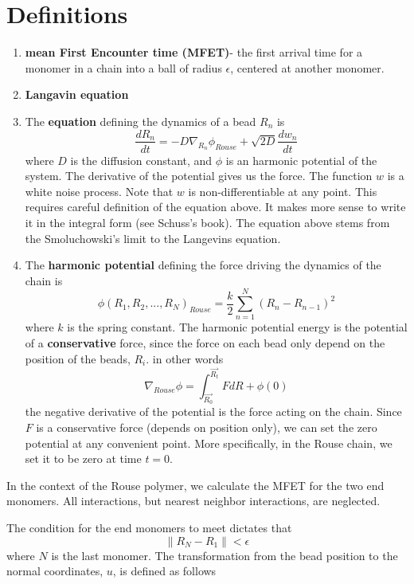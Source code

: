 \documentclass[12pt]{report}
\begin{document}
\section{Definitions}
\begin{enumerate}
\item \textbf{mean First Encounter time (MFET)}- the first arrival time for a monomer in a chain into a ball of radius $\epsilon$, centered at another monomer. 
\item \textbf{Langavin equation}
\item The \textbf{equation} defining the dynamics of a bead $R_n$ is 
\begin{equation*}
\frac{dR_n}{dt}=-D\nabla_{R_n}\phi_{Rouse} +\sqrt{2D}\frac{dw_n}{dt}
\end{equation*}
where $D$ is the diffusion constant, and $\phi$ is an harmonic potential of the system. The derivative of the potential gives us the force. The function $w$ is a white noise process. Note that $w$ is non-differentiable at any point. This requires careful definition of the equation above. It makes more sense to write it in the integral form (see Schuss's book). The equation above stems from the Smoluchowski's limit to the Langevins equation.

\item The \textbf{harmonic potential} defining the force driving the dynamics of the chain is 
\begin{equation*}
\phi(R_1,R_2,...,R_N)_{Rouse} = \frac{k}{2}\sum_{n=1}^{N}(R_n-R_{n-1})^2
\end{equation*}
where $k$ is the spring constant. The harmonic potential energy is the potential of a \textbf{conservative} force, since the force on each bead only depend on the position of the beads, $R_i$.
in other words 
\begin{equation}
\nabla_{Rouse}\phi = \int_{\vec{R_0}}^{\vec{R_t}}FdR +\phi(0)
\end{equation}  
the negative derivative of the potential is the force acting on the chain. Since $F$ is a conservative force (depends on position only), we can set the zero potential at any convenient point. More specifically, in the Rouse chain, we set it to be zero at time $t=0$.
\end{enumerate}

In the context of the Rouse polymer, we calculate the MFET for the two end monomers. All interactions, but nearest neighbor interactions, are neglected. 

The condition for the end monomers to meet dictates that 
\begin{equation*}
\|R_N-R_1\|<\epsilon
\end{equation*}
where $N$ is the last monomer. The transformation from the bead position to the normal coordinates, $u$, is defined as follows
\end{document}
